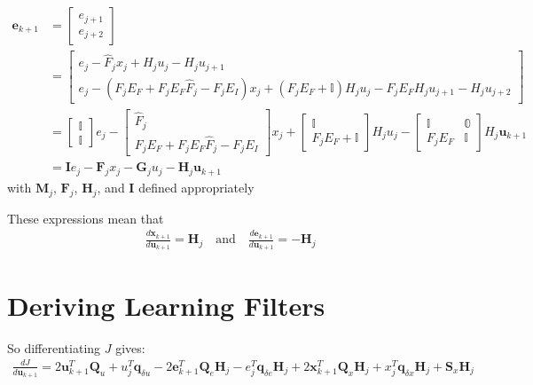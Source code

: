 \documentclass[landscape]{article}
\begin{document}
\begin{align}
\mathbf{e}_{k+1} 
& = \begin{bmatrix} e_{j+1} \\ e_{j+2}\end{bmatrix} \\
& = \begin{bmatrix} e_j - \hat{F}_j x_j + H_j u_j - H_j u_{j+1} \\ e_j - \left(F_j E_F + F_j E_F \hat{F}_j - F_j E_I\right)x_j + \left(F_j E_F +\mathbb{I} \right) H_j u_j - F_j E_F H_j u_{j+1}   - H_j u_{j+2}\end{bmatrix} \\
& = 
\begin{bmatrix} \mathbb{I}       \\   \mathbb{I}   \end{bmatrix}              e_j 
- \begin{bmatrix} \hat{F}_j        \\  F_j E_F + F_j E_F \hat{F}_j - F_j E_I  \end{bmatrix}              x_j 
+ \begin{bmatrix} \mathbb{I}       \\   F_j E_F + \mathbb{I}  \end{bmatrix} H_j u_j
- \begin{bmatrix} \mathbb{I} & \mathbb{0} \\   F_j E_F  & \mathbb{I}     \end{bmatrix} H_j \mathbf{u}_{k+1} \\
& = \mathbf{I} e_j - \mathbf{F}_j x_j - \mathbf{G}_j u_j - \mathbf{H}_j \mathbf{u}_{k+1} 
\end{align}
with $\mathbf{M}_j$, $\mathbf{F}_j$, $\mathbf{H}_j$, and $\mathbf{I}$ defined appropriately 

These expressions mean that 
\begin{align}
\frac{d\mathbf{x}_{k+1} }{d\mathbf{u}_{k+1} } = \mathbf{H}_j \quad \mathrm{and} \quad
\frac{d\mathbf{e}_{k+1} }{d\mathbf{u}_{k+1} } = -\mathbf{H}_j
\end{align}

\section{Deriving Learning Filters}

So differentiating $J$ gives:
\begin{align}
\frac{dJ}{d\mathbf{u}_{k+1} } 
= 2 \mathbf{u}_{k+1}^T \mathbf{Q}_u 
+ u_j^T \mathbf{q}_{\delta u} 
- 2 \mathbf{e}_{k+1}^T \mathbf{Q}_e \mathbf{H}_j 
- e_j^T \mathbf{q}_{\delta e} \mathbf{H}_j
+ 2 \mathbf{x}_{k+1}^T \mathbf{Q}_x \mathbf{H}_j
+ x_j^T \mathbf{q}_{\delta x} \mathbf{H}_j  
+ \mathbf{S}_x \mathbf{H}_j
\end{align}
\end{document}
